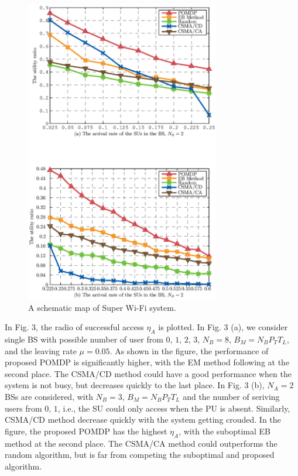 \documentclass[conference]{IEEEtran}
\begin{document}
\begin{figure}[t]
\centering
\includegraphics[width=8.5cm]{2_fig1.eps}
\caption{A schematic map of Super Wi-Fi system.}
\end{figure}
\indent In Fig. 3, the radio of successful access \(\eta_A\) is plotted. 
In Fig. 3 (a), we consider single BS with possible number of user from \(0,\, 1,\, 2,\, 3\), \(N_B = 8\), \(B_M = N_BP_TT_L\),
and the leaving rate \(\mu = 0.05\). As shown in the figure, the performance of proposed POMDP is significantly higher, 
with the EM method following at the second place. 
The CSMA/CD method could have a good performance when the system is not busy, but decreases quickly to the last place.
In Fig. 3 (b), \(N_A = 2\) BSs are considered, 
with \(N_B = 3\), \(B_M = N_BP_TT_L\) and the number of seriving users from \(0,\, 1\), 
i.e., the SU could only access when the PU is absent. Similarly, CSMA/CD method decrease quickly with the system getting crouded.
In the figure, the proposed POMDP has the highest \(\eta_A\), with the suboptimal EB method at the second place. 
The CSMA/CA method could outperforms the random algorithm, but is far from competing the suboptimal and proposed algorithm.\\
\end{document}
